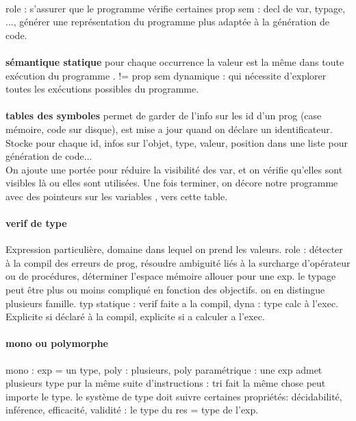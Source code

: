\documentclass{article}
\begin{document}
\paragraph{} role : s'assurer que le programme vérifie certaines prop sem : decl de var, typage, ..., générer une représentation du programme plus adaptée à la génération de code.\\\\\indent\textbf{sémantique statique} pour chaque occurrence la valeur est la même dans toute exécution du programme . != prop sem dynamique : qui nécessite d'explorer toutes les exécutions possibles du programme.\\\\\indent\textbf{tables des symboles} permet de garder de l'info sur les id d'un prog (case mémoire, code sur disque), est mise a jour quand on déclare un identificateur. Stocke pour chaque id, infos sur l'objet, type, valeur, position dans une liste pour génération de code... \\ On ajoute une portée pour réduire la visibilité des var, et on vérifie qu'elles sont visibles là ou elles sont utilisées.  Une fois terminer, on décore notre programme avec des pointeurs sur les variables , vers cette table.
\paragraph{verif de type} Expression particulière, domaine dans lequel on prend les valeurs.
role : détecter à la compil des erreurs de prog, résoudre ambiguité liés à la surcharge d'opérateur ou de procédures, déterminer l'espace mémoire allouer pour une exp. le typage peut être plus ou moins compliqué en fonction des objectifs. on en distingue plusieurs famille. typ statique : verif faite a la compil, dyna : type  calc à l'exec. Explicite si déclaré à la compil, explicite si a calculer a l'exec.

\paragraph{mono ou polymorphe} mono : exp = un type, poly : plusieurs, poly paramétrique : une exp admet plusieurs type pur la même suite d’instructions : tri fait la même chose peut importe le type. le système de type doit suivre certaines propriétés: décidabilité, inférence, efficacité, validité : le type du res  = type de l'exp.
\end{document}
